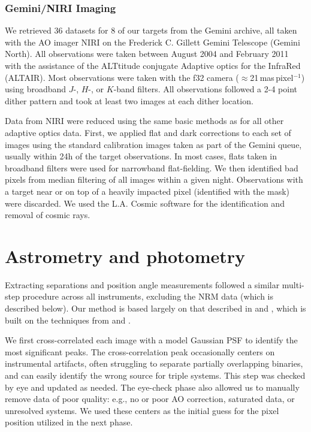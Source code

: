 \documentclass[twocolumn]{aastex62}
\begin{document}
\subsubsection{Gemini/NIRI Imaging}
We retrieved 36 datasets for 8 of our targets from the Gemini archive, all taken with the AO imager NIRI \citep{2003PASP..115.1388H} on the Frederick C. Gillett Gemini Telescope (Gemini North). All observations were taken between August 2004 and February 2011 with the assistance of the ALTtitude conjugate Adaptive optics for the InfraRed (ALTAIR). Most observations were taken with the f32 camera ($\approx$21\,mas\,pixel$^{-1}$) using broadband $J$-, $H$-, or $K$-band filters. All observations followed a 2-4 point dither pattern and took at least two images at each dither location. 

Data from NIRI were reduced using the same basic methods as for all other adaptive optics data. First, we applied flat and dark corrections to each set of images using the standard calibration images taken as part of the Gemini queue, usually within 24h of the target observations. In most cases, flats taken in broadband filters were used for narrowband flat-fielding. We then identified bad pixels from median filtering of all images within a given night. Observations with a target near or on top of a heavily impacted pixel (identified with the mask) were discarded. We used the L.A. Cosmic software for the identification and removal of cosmic rays. 

\section{Astrometry and photometry}\label{sec:astrometry}

Extracting separations and position angle measurements followed a similar multi-step procedure across all instruments, excluding the NRM data (which is described below). Our method is based largely on that described in \citet{2016ApJ...817...80D} and \citet{Dupuy2017}, which is built on the techniques from \citet{2008ApJ...689..436L} and \citet{2010ApJ...721.1725D}.

We first cross-correlated each image with a model Gaussian PSF to identify the most significant peaks. The cross-correlation peak occasionally centers on instrumental artifacts, often struggling to separate partially overlapping binaries, and can easily identify the wrong source for triple systems. This step was checked by eye and updated as needed. The eye-check phase also allowed us to manually remove data of poor quality: e.g., no or poor AO correction, saturated data, or unresolved systems. We used these centers as the initial guess for the pixel position utilized in the next phase. 
\end{document}
